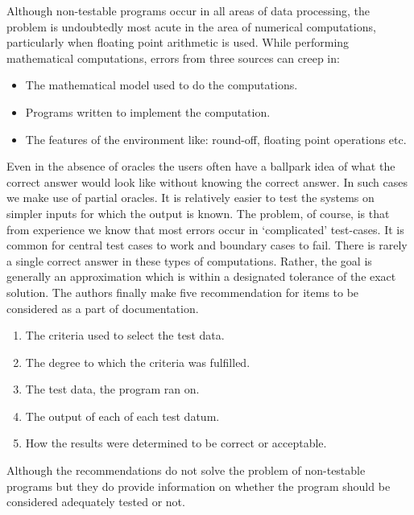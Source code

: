 Although non-testable programs occur in all areas of data processing, the problem is undoubtedly most acute in the area of numerical computations, particularly when floating point arithmetic is used. While performing mathematical computations, errors from three sources can creep in:
\begin{itemize}
  \item The mathematical model used to do the computations.
  \item Programs written to implement the computation.
  \item The features of the environment like: round-off, floating point operations etc.
\end{itemize}
Even in the absence of oracles the users often have a ballpark idea of what the correct answer would look like without knowing the correct answer. In such cases we make use of partial oracles. It is relatively easier to test the systems on simpler inputs for which the output is known. The problem, of course, is that from experience we know that most errors occur in ‘complicated’ test-cases. It is common for central test cases to work and boundary cases to fail. There is rarely a single correct answer in these types of computations. Rather, the goal is generally an approximation which is within a designated tolerance of the exact solution. The authors finally make five recommendation for items to be considered as a part of documentation.
\begin{enumerate}
  \item The criteria used to select the test data.
  \item The degree to which the criteria was fulfilled.
  \item The test data, the program ran on.
  \item The output of each of each test datum.
  \item How the results were determined to be correct or acceptable.
\end{enumerate}
Although the recommendations do not solve the problem of non-testable programs but they do provide information on whether the program should be considered adequately tested or not.
